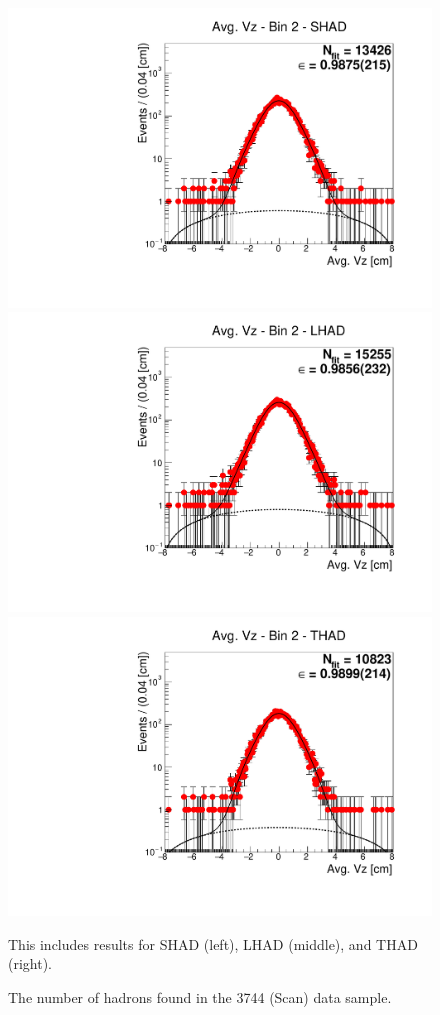 \begin{figure}[H]
\centering
\includegraphics[scale=0.25]{figures/plots/nonDDbar_fit_results/scan/fit_scan_02_data_SHAD.pdf}
\hspace{-0.5cm}
\includegraphics[scale=0.25]{figures/plots/nonDDbar_fit_results/scan/fit_scan_02_data_LHAD.pdf}
\hspace{-0.5cm}
\includegraphics[scale=0.25]{figures/plots/nonDDbar_fit_results/scan/fit_scan_02_data_THAD.pdf}
\caption{The number of hadrons found in the 3744 (Scan) data sample.}
{This includes results for SHAD (left), LHAD (middle), and THAD (right).}
\label{fig:hadron_fits_scan_02}
\end{figure}

